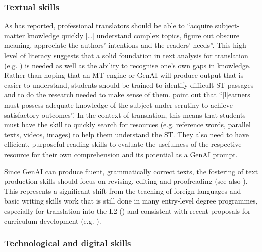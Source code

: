 \documentclass[output=paper]{langscibook}
\begin{document}
\subsubsection{Textual skills} %

As \citet[43]{lafeber_skills_2023} has reported, professional translators should be able to “acquire subject-matter knowledge quickly […] understand complex topics, figure out obscure meaning, appreciate the authors’ intentions and the readers’ needs”. This high level of literacy suggests that a solid foundation in text analysis for translation (e.g. \citealt{nord_text_2005}) is needed as well as the ability to recognise one’s own gaps in knowledge. Rather than hoping that an MT engine or GenAI will produce output that is easier to understand, students should be trained to identify difficult ST passages and to do the research needed to make sense of them. \citet[37]{gimpel_unlocking_2023} point out that “[l]earners must possess adequate knowledge of the subject under scrutiny to achieve satisfactory outcomes”. In the context of translation, this means that students must have the skill to quickly search for resources (e.g. reference words, parallel texts, videos, images) to help them understand the ST. They also need to have efficient, purposeful reading skills to evaluate the usefulness of the respective resource for their own comprehension and its potential as a GenAI prompt.

Since GenAI can produce fluent, grammatically correct texts, the fostering of text production skills should focus on revising, editing and proofreading (see also \citealt{koponen_translation_2021}). This represents a significant shift from the teaching of foreign languages and basic writing skills work that is still done in many entry-level degree programmes, especially for translation into the L2 (\citealt{cerezo_herrero_lsp_2021}) and consistent with recent proposals for curriculum development (e.g. \citealt{sawyer_evolving_2019}). 

\subsubsection{Technological and digital skills} %
\end{document}
